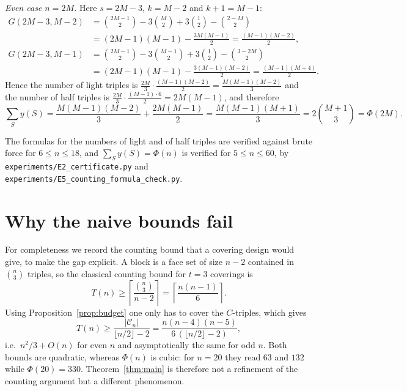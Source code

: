 \documentclass[11pt,a4paper]{article}
\theoremstyle{definition}
\begin{document}
\emph{Even case $n = 2M$.} Here $s = 2M-3$, $k = M-2$ and $k+1 = M-1$:
\begin{align*}
G(2M-3, M-2) &= \binom{2M-1}{2} - 3\binom{M}{2} + 3\binom{1}{2} - \binom{2-M}{2} \\
             &= (2M-1)(M-1) - \tfrac{3M(M-1)}{2} = \frac{(M-1)(M-2)}{2},\\
G(2M-3, M-1) &= \binom{2M-1}{2} - 3\binom{M-1}{2} + 3\binom{1}{2} - \binom{3-2M}{2} \\
             &= (2M-1)(M-1) - \tfrac{3(M-1)(M-2)}{2} = \frac{(M-1)(M+4)}{2}.
\end{align*}
Hence the number of light triples is
$\frac{2M}{3}\cdot\frac{(M-1)(M-2)}{2} = \frac{M(M-1)(M-2)}{3}$ and the number
of half triples is
$\frac{2M}{3}\cdot\frac{(M-1)\cdot 6}{2} = 2M(M-1)$, and therefore
\[
\sum_S y(S) = \frac{M(M-1)(M-2)}{3} + \frac{2M(M-1)}{2}
            = \frac{M(M-1)(M+1)}{3} = 2\binom{M+1}{3} = \Phi(2M).
\]

The formulas for the numbers of light and of half triples are verified against
brute force for $6 \le n \le 18$, and $\sum_S y(S) = \Phi(n)$ is verified for
$5 \le n \le 60$, by \texttt{experiments/E2\_certificate.py} and
\texttt{experiments/E5\_counting\_formula\_check.py}.

\section{Why the naive bounds fail}\label{app:capacity}

For completeness we record the counting bound that a covering design would give,
to make the gap explicit. A block is a face set of size $n-2$ contained in
$\binom{n}{3}$ triples, so the classical counting bound for $t = 3$ coverings is
\begin{equation}\label{eq:capacity}
  T(n) \ge \left\lceil \frac{\binom{n}{3}}{n-2} \right\rceil
        = \left\lceil \frac{n(n-1)}{6} \right\rceil .
\end{equation}
Using Proposition~\ref{prop:budget} one only has to cover the $C$-triples, which
gives
\[
T(n) \ge \frac{|\mathcal{C}_n|}{\lfloor n/2 \rfloor - 2}
      = \frac{n(n-4)(n-5)}{6\,(\lfloor n/2 \rfloor - 2)},
\]
i.e.\ $n^2/3 + O(n)$ for even $n$ and asymptotically the same for odd $n$.
Both bounds are quadratic, whereas $\Phi(n)$ is cubic: for $n = 20$ they read
$63$ and $132$ while $\Phi(20) = 330$. Theorem~\ref{thm:main} is therefore not a
refinement of the counting argument but a different phenomenon.
\end{document}
